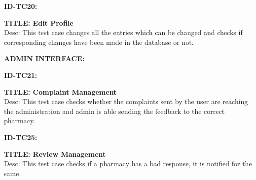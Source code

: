 \documentclass{article}
\begin{document}
\item \textbf{ID-TC20:}
\item \textbf{TITLE: Edit Profile}\\
Desc: This test case changes all the entries which can be changed and checks if corresponding changes have been made in the database or not.\\

\item \textbf{ADMIN INTERFACE:}\\

\item \textbf{ID-TC21:}
\item \textbf{TITLE: Complaint Management}\\
Desc: This test case checks whether the complaints sent by the user are reaching the administration and admin is able sending the feedback to the correct pharmacy.\\

\item \textbf{ID-TC25:}
\item \textbf{TITLE: Review Management}\\
Desc: 	This test case checks if a pharmacy has a bad response, it is notified for the same.\\
\end{document}
